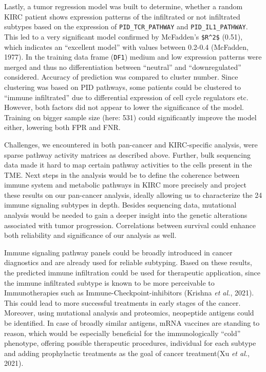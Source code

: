 \documentclass[
  parskip,
  oneside]{scrreprt}
\begin{document}
Lastly, a tumor regression model was built to determine, whether a
random KIRC patient shows expression patterns of the infiltrated or not
infiltrated subtypes based on the expression of
\texttt{PID\_TCR\_PATHWAY} and \texttt{PID\_IL1\_PATHWAY}. This led to a
very significant model confirmed by McFadden's \texttt{\$R\^{}2\$}
(0.51), which indicates an ``excellent model'' with values between
0.2-0.4 (McFadden, 1977). In the training data frame (\texttt{DF1})
medium and low expression patterns were merged and thus no
differentiation between ``neutral'' and ``downregulated'' considered.
Accuracy of prediction was compared to cluster number. Since clustering
was based on PID pathways, some patients could be clustered to ``immune
infiltrated'' due to differential expression of cell cycle regulators
etc. However, both factors did not appear to lower the significance of
the model. Training on bigger sample size (here: 531) could
significantly improve the model either, lowering both FPR and FNR.

Challenges, we encountered in both pan-cancer and KIRC-specific
analysis, were sparse pathway activity matrices as described above.
Further, bulk sequencing data made it hard to map certain pathway
activities to the cells present in the TME. Next steps in the analysis
would be to define the coherence between immune system and metabolic
pathways in KIRC more precisely and project these results on our
pan-cancer analysis, ideally allowing us to characterize the 24 immune
signaling subtypes in depth. Besides sequencing data, mutational
analysis would be needed to gain a deeper insight into the genetic
alterations associated with tumor progression. Correlations between
survival could enhance both reliability and significance of our analysis
as well.


Immune signaling pathway panels could be broadly introduced in cancer
diagnostics and are already used for reliable subtyping. Based on these
results, the predicted immune infiltration could be used for therapeutic
application, since the immune infiltrated subtype is known to be more
perceivable to Immunotherapies such as Immune-Checkpoint-inhibitors
(Krishna \emph{et al.}, 2021). This could lead to more successful
treatments in early stages of the cancer. Moreover, using mutational
analysis and proteomics, neopeptide antigens could be identified. In
case of broadly similar antigens, mRNA vaccines are standing to reason,
which would be especially beneficial for the immunologically ``cold''
phenotype, offering possible therapeutic procedures, individual for each
subtype and adding prophylactic treatments as the goal of cancer
treatment(Xu \emph{et al.}, 2021).
\end{document}
